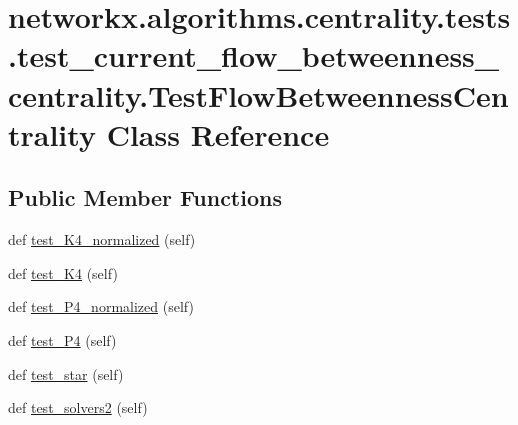 \hypertarget{classnetworkx_1_1algorithms_1_1centrality_1_1tests_1_1test__current__flow__betweenness__centrali4423af8433073615a8a3f6b60e6093bd}{}\section{networkx.\+algorithms.\+centrality.\+tests.\+test\+\_\+current\+\_\+flow\+\_\+betweenness\+\_\+centrality.\+Test\+Flow\+Betweenness\+Centrality Class Reference}
\label{classnetworkx_1_1algorithms_1_1centrality_1_1tests_1_1test__current__flow__betweenness__centrali4423af8433073615a8a3f6b60e6093bd}
\subsection*{Public Member Functions}
\begin{DoxyCompactItemize}
\item 
def \hyperlink{classnetworkx_1_1algorithms_1_1centrality_1_1tests_1_1test__current__flow__betweenness__centrali4423af8433073615a8a3f6b60e6093bd_a6ac229c979a1c28a981551792eb4683d}{test\+\_\+\+K4\+\_\+normalized} (self)
\item 
def \hyperlink{classnetworkx_1_1algorithms_1_1centrality_1_1tests_1_1test__current__flow__betweenness__centrali4423af8433073615a8a3f6b60e6093bd_aaeea38a744f091153c0735844e437692}{test\+\_\+\+K4} (self)
\item 
def \hyperlink{classnetworkx_1_1algorithms_1_1centrality_1_1tests_1_1test__current__flow__betweenness__centrali4423af8433073615a8a3f6b60e6093bd_abeacd909770adadd433c30b9997434fc}{test\+\_\+\+P4\+\_\+normalized} (self)
\item 
def \hyperlink{classnetworkx_1_1algorithms_1_1centrality_1_1tests_1_1test__current__flow__betweenness__centrali4423af8433073615a8a3f6b60e6093bd_a2d51d6ff70f824748d37c765e302c420}{test\+\_\+\+P4} (self)
\item 
def \hyperlink{classnetworkx_1_1algorithms_1_1centrality_1_1tests_1_1test__current__flow__betweenness__centrali4423af8433073615a8a3f6b60e6093bd_a71f96ea76efe5f1bbed76e42ffaeafcb}{test\+\_\+star} (self)
\item 
def \hyperlink{classnetworkx_1_1algorithms_1_1centrality_1_1tests_1_1test__current__flow__betweenness__centrali4423af8433073615a8a3f6b60e6093bd_afcd4cfa294834ab26c5adc8282887f20}{test\+\_\+solvers2} (self)
\end{DoxyCompactItemize}


